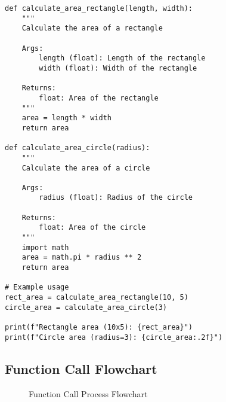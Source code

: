 \documentclass[12pt,a4paper]{article}
\begin{document}
\begin{codebox}{}
\begin{lstlisting}[style=python]
def calculate_area_rectangle(length, width):
    """
    Calculate the area of a rectangle
    
    Args:
        length (float): Length of the rectangle
        width (float): Width of the rectangle
    
    Returns:
        float: Area of the rectangle
    """
    area = length * width
    return area

def calculate_area_circle(radius):
    """
    Calculate the area of a circle
    
    Args:
        radius (float): Radius of the circle
    
    Returns:
        float: Area of the circle
    """
    import math
    area = math.pi * radius ** 2
    return area

# Example usage
rect_area = calculate_area_rectangle(10, 5)
circle_area = calculate_area_circle(3)

print(f"Rectangle area (10x5): {rect_area}")
print(f"Circle area (radius=3): {circle_area:.2f}")
\end{lstlisting}
\end{codebox}

\subsection{Function Call Flowchart}

\begin{figure}[H]
\centering
{}
\caption{Function Call Process Flowchart}
\end{figure}
\end{document}
